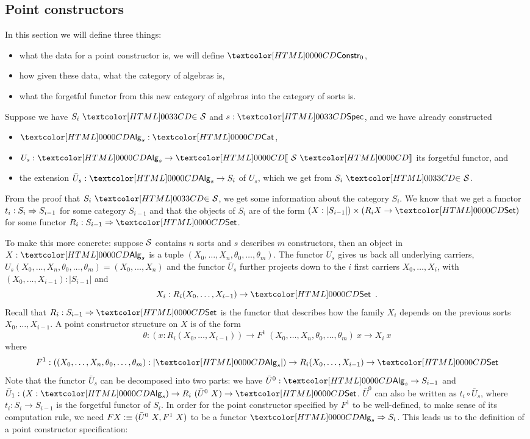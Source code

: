 \subsection{Point constructors}
\label{point-constructors}

In this section we will define three things:
%
\begin{itemize}
\item what the data for a point constructor is, \ie we will define $\Constr_0$,
\item how given these data, what the category of algebras is,
\item what the forgetful functor from this new category of algebras
  into the category of sorts is.
\end{itemize}
%
Suppose we have $\sortsin{S_i}{\Ss}$ and $s : \specty$, and we have
already constructed
%
\begin{itemize}
\item $\Alg_s : \Cat$,
\item $U_s : \Alg_s \to \SortCat{\Ss}$ its forgetful functor, and
\item the extension $\bar{U}_s : \Alg_s \to S_i$ of $U_s$, which we
  get from $\sortsin{S_i}{\Ss}$.
\end{itemize}
%
From the proof that $\sortsin{S_i}{\Ss}$, we get some information
about the category $S_i$. We know that we get a functor
$t_i : S_i \Rightarrow S_{i-1}$ for some category $S_{i-1}$ and that the
objects of $S_i$ are of the form
$(X : | S_{i-1} |) \times (R_i X \to \Set)$ for some functor
$R_i : \Func{S_{i-1}}{\Set}$.

To make this more concrete: suppose $\mathcal{S}$ contains $n$ sorts and $s$
describes $m$ constructors, then an object in $X : \Alg_s$ is a tuple
$(X_0, \hdots, X_n, \theta_0, \hdots, \theta_m)$. The functor $U_s$
gives us back all underlying carriers, \ie
$U_s(X_0, \hdots, X_n, \theta_0, \hdots, \theta_m) = (X_0, \hdots,
X_n)$
and the functor $\bar{U}_s$ further projects down to the $i$ first
carriers $X_0, \hdots, X_i$, with
$(X_0, \hdots, X_{i-1}) : | S_{i-1} |$ and
\[
X_i : R_i (X_0, \hdots, X_{i-1}) \to \Set \enspace .
\]
Recall that $R_i : \Func{S_{i-1}}{\Set}$ is the functor that describes how
the family $X_i$ depends on the previous sorts $X_0, \hdots,
X_{i-1}$. A point constructor structure on $X$ is of the form
$$
\theta : (x : R_i (X_0, \hdots, X_{i-1})) \to F^1\ (X_0, \hdots, X_n, \theta_0, \hdots, \theta_m)\ x \to X_i\ x
$$
where
$$
F^1 : ((X_0,\hdots,X_n,\theta_0,\hdots,\theta_m) : | \Alg_s |) \to R_i (X_0, \hdots, X_{i-1}) \to \Set
$$
Note that the functor $\bar{U}_s$ can be decomposed into two parts: we
have $\bar{U}^0 : \Alg_s \to S_{i-1}$ and
$\bar{U}_1 : (X : \Alg_s) \to R_i\ (\bar{U}^0\ X) \to \Set$.
$\bar{U}^0$ can also be written as $t_i \circ \bar{U}_s$, where
$t_i : S_i \to S_{i-1}$ is the forgetful functor of $S_i$. In order
for the point constructor specified by $F^1$ to be well-defined, \ie
to make sense of its computation rule, we need
$F X :\equiv (\bar{U}^0\ X, F^1\ X)$ to be a functor
$\Func{\Alg_s}{S_i}$.  This leads us to the definition of a point
constructor specification:

